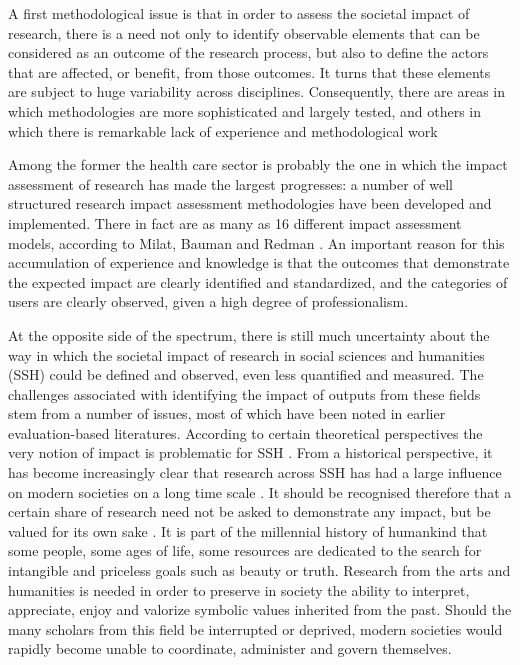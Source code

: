 \documentclass[]{book}
\begin{document}
A first methodological issue is that in order to assess the societal
impact of research, there is a need not only to identify observable
elements that can be considered as an outcome of the research process,
but also to define the actors that are affected, or benefit, from those
outcomes. It turns that these elements are subject to huge variability
across disciplines. Consequently, there are areas in which methodologies
are more sophisticated and largely tested, and others in which there is
remarkable lack of experience and methodological work
\citep[\citet{cturcan2015national}]{stern2013long, mitton2007knowledge}

Among the former the health care sector is probably the one in which the
impact assessment of research has made the largest progresses: a number
of well structured research impact assessment methodologies have been
developed and implemented. There in fact are as many as 16 different
impact assessment models, according to Milat, Bauman and Redman
\citep{milat2015narrative}. An important reason for this accumulation of
experience and knowledge is that the outcomes that demonstrate the
expected impact are clearly identified and standardized, and the
categories of users are clearly observed, given a high degree of
professionalism.

At the opposite side of the spectrum, there is still much uncertainty
about the way in which the societal impact of research in social
sciences and humanities (SSH) could be defined and observed, even less
quantified and measured. The challenges associated with identifying the
impact of outputs from these fields stem from a number of issues, most
of which have been noted in earlier evaluation-based literatures.
According to certain theoretical perspectives the very notion of impact
is problematic for SSH \citep{blasi2018ssh}. From a historical
perspective, it has become increasingly clear that research across SSH
has had a large influence on modern societies on a long time scale
\citep{bod2013new}. It should be recognised therefore that a certain
share of research need not be asked to demonstrate any impact, but be
valued for its own sake \citep{small2013value}. It is part of the
millennial history of humankind that some people, some ages of life,
some resources are dedicated to the search for intangible and priceless
goals such as beauty or truth. Research from the arts and humanities is
needed in order to preserve in society the ability to interpret,
appreciate, enjoy and valorize symbolic values inherited from the past.
Should the many scholars from this field be interrupted or deprived,
modern societies would rapidly become unable to coordinate, administer
and govern themselves.
\end{document}
